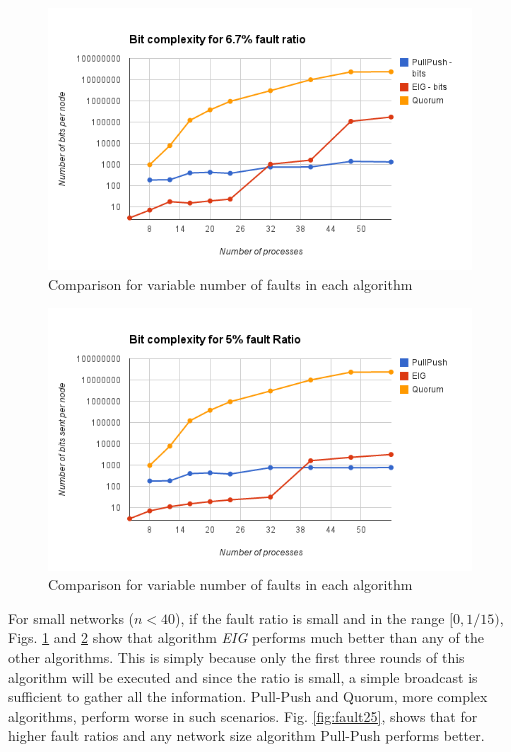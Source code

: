 \begin{figure}[ht]
 \centering
\includegraphics[scale=0.4]{Fault667}
\caption{ Comparison for variable number of faults in each algorithm}
 \label{fig:fault667}
\end{figure}

\begin{figure}[ht]
 \centering
\includegraphics[scale=0.4]{Fault5}
\caption{ Comparison for variable number of faults in each algorithm}
 \label{fig:fault5}
\end{figure}

For small networks ($n < 40$), if the fault ratio is small and in the range $[0, 1/15)$, Figs. \ref{fig:fault667} and \ref{fig:fault5} show that algorithm \textit{EIG} performs much better than any of the other algorithms. This is simply because only the first three rounds of this algorithm will be executed and since the ratio is small, a simple broadcast is sufficient to gather all the information. Pull-Push and Quorum, more complex algorithms, perform worse in such scenarios. Fig. \ref{fig:fault25}, shows that for higher fault ratios and any network size algorithm Pull-Push performs better.

